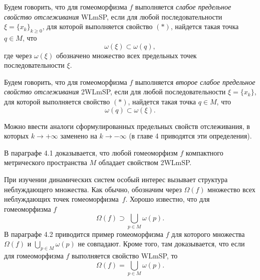 \documentclass[12pt]{article}
\begin{document}
{%
 Будем говорить, что для гомеоморфизма $f$ выполняется \textit{слабое пре\-де\-ль\-ное свойс\-тво отслеживания} WLmSP, если для любой после\-до\-ва\-те\-льности $\xi\!=\!\{x_k\}_{k\geq0}$, для которой выполняется свойство $(*)$, найдется такая точ\-ка $q\in\! M$, что 
$$\omega(\xi)\subset\omega(q),$$
где через $\omega(\xi)$ обозначено множество всех предельных точек последовательности $\xi$.

%
%
 
  Будем говорить, что для гомеоморфизма $f$ выполняется \textit{вто\-рое сла\-бое предельное свойс\-тво отслеживания} 2WLmSP, если для любой пос\-ле\-до\-вательности $\xi\!=\!\{x_k\}$, для которой выполняется свойство $(*)$, найдется такая точка $q\in\! M$, что 
$$\omega(q)\subset\omega(\xi).$$

Можно ввести аналоги сформулированных предельных свойств от\-сле\-жи\-ва\-ния, в которых $k\rightarrow+\infty$ заменено на $k\rightarrow-\infty$ (в главе 4 приводятся эти определения).

В параграфе 4.1 доказывается, что любой гомеоморфизм $f$ ком\-пак\-т\-ного мет\-рического пространства $M$ обладает свойством 2WLmSP.

 При изучении динамических систем особый интерес вызыва\-ет струк\-тура неблуждающего множества. Как обычно, обозначим через $\Omega(f)$ мно\-жес\-тво всех неблуждающих точек гомеоморфизма~$f$.
Хорошо известно, что для гомеоморфизма $f$
$$\Omega(f)\supset \bigcup_{p\in M}\omega(p).$$
В параграфе 4.2 приводится пример гомеоморфизма $f$ для которого множества $\Omega(f)$ и $\bigcup_{p\in M}\omega(p)$ не совпадают. Кроме того, там доказывается, что если для гомеоморфизма $f$ выполняется свойство WLmSP, то
$$\Omega(f)= \bigcup_{p\in M}\omega(p).$$

}
\end{document}
